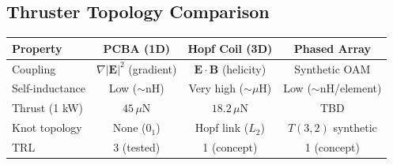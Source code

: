 \subsection*{Thruster Topology Comparison}
\begin{center}
\small
\renewcommand{\arraystretch}{1.2}
\begin{tabular}{lccc}
\toprule
\textbf{Property} & \textbf{PCBA (1D)} & \textbf{Hopf Coil (3D)} & \textbf{Phased Array} \\
\midrule
Coupling          & $\nabla|\mathbf{E}|^2$ (gradient) & $\mathbf{E}\cdot\mathbf{B}$ (helicity) & Synthetic OAM \\
Self-inductance   & Low ($\sim$nH) & Very high ($\sim\mu$H) & Low ($\sim$nH/element) \\
Thrust (1 kW)     & $45\,\mu$N & $18.2\,\mu$N & TBD \\
Knot topology     & None ($0_1$) & Hopf link ($L_2$) & $T(3,2)$ synthetic \\
TRL               & 3 (tested) & 1 (concept) & 1 (concept) \\
\bottomrule
\end{tabular}
\end{center}
